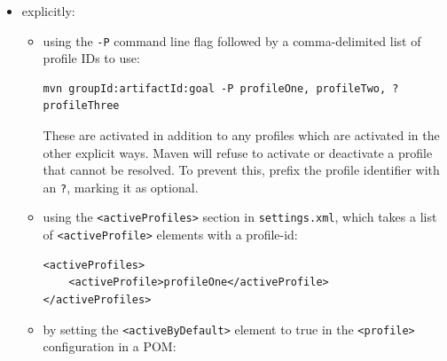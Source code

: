 \documentclass[table, xcdraw]{article}%
\begin{document}
\begin{itemize}
    \item explicitly:
    \begin{itemize}
        \item using the \texttt{-P} command line flag followed by a comma-delimited list of profile IDs to use:

        \begin{verbatim}
mvn groupId:artifactId:goal -P profileOne, profileTwo, ?profileThree
        \end{verbatim}
        
        
        These are activated in addition to any profiles which are activated in the other explicit ways. Maven will refuse to activate or deactivate a profile that cannot be resolved. To prevent this, prefix the profile identifier with an \texttt{?}, marking it as optional.
        \item using the \texttt{<activeProfiles>} section in \texttt{settings.xml}, which takes a list of \texttt{<activeProfile>} elements with a profile-id:

        \begin{verbatim}
<activeProfiles>
    <activeProfile>profileOne</activeProfile>
</activeProfiles>
        \end{verbatim}
        \item by setting the \texttt{<activeByDefault>} element to true in the \texttt{<profile>} configuration in a POM:


\end{itemize}
\end{itemize}
\end{document}
